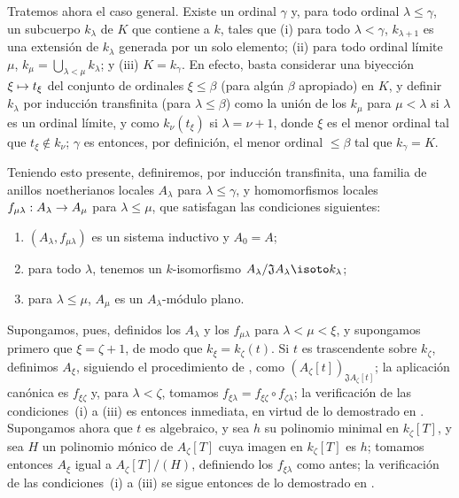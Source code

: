 \documentclass[oneside]{amsart}
\makeatletter
\renewcommand{\leq}{\leqslant}
\newcommand{\ega@arrow}[2]{\mathchoice{#1}{#2}{#2}{#2}}
\let\ega@shortmapsto\mapsto
\renewcommand{\to}{\ega@arrow{\longrightarrow}{\rightarrow}}
\renewcommand{\mapsto}{\ega@arrow{\longmapsto}{\ega@shortmapsto}}
\let\EGAOriginalLabel\label
\renewcommand{\label}[1]{\phantomsection\EGAOriginalLabel{#1}}
\makeatother
\begin{document}
\begin{env}[10.3.1.4]
\label{0.10.3.1.4}
Tratemos ahora el caso general.
Existe un ordinal $\gamma$ y, para todo ordinal $\lambda\leq\gamma$, un subcuerpo $k_\lambda$ de $K$ que contiene a $k$, tales que (i) para todo $\lambda<\gamma$, $k_{\lambda+1}$ es una extensión de $k_\lambda$ generada por un solo elemento; (ii) para todo ordinal límite $\mu$, $k_\mu=\bigcup_{\lambda<\mu}k_\lambda$; y (iii) $K=k_\gamma$.
En efecto, basta considerar una biyección $\xi\mapsto t_\xi$ del conjunto de ordinales $\xi\leq\beta$ (para algún $\beta$ apropiado) en $K$, y definir $k_\lambda$ por inducción transfinita (para $\lambda\leq\beta$) como la unión de los $k_\mu$ para $\mu<\lambda$ si $\lambda$ es un ordinal límite, y como $k_\nu(t_\xi)$ si $\lambda=\nu+1$, donde $\xi$ es el menor ordinal tal que $t_\xi\not\in k_\nu$;
$\gamma$ es entonces, por definición, el menor ordinal $\leq\beta$ tal que $k_\gamma=K$.

Teniendo esto presente, definiremos, por inducción transfinita, una familia de anillos noetherianos locales $A_\lambda$ para $\lambda\leq\gamma$, y homomorfismos locales $f_{\mu\lambda}:A_\lambda\to A_\mu$ para $\lambda\leq\mu$, que satisfagan las condiciones siguientes:
\begin{enumerate}
  \item[(i)] $(A_\lambda,f_{\mu\lambda})$ es un sistema inductivo y $A_0=A$;
  \item[(ii)] para todo $\lambda$, tenemos un $k$-isomorfismo $A_\lambda/\mathfrak{J}A_\lambda\isoto k_\lambda$;
  \item[(iii)] para $\lambda\leq\mu$, $A_\mu$ es un $A_\lambda$-módulo plano.
\end{enumerate}

Supongamos, pues, definidos los $A_\lambda$ y los $f_{\mu\lambda}$ para $\lambda<\mu<\xi$, y supongamos primero que $\xi=\zeta+1$, de modo que $k_\xi=k_\zeta(t)$.
Si $t$ es trascendente sobre $k_\zeta$, definimos $A_\xi$, siguiendo el procedimiento de , como $(A_\zeta[t])_{\mathfrak{J}A_\zeta[t]}$;
la aplicación canónica es $f_{\xi\zeta}$ y, para $\lambda<\zeta$, tomamos $f_{\xi\lambda}=f_{\xi\zeta}\circ f_{\zeta\lambda}$;
la verificación de las condiciones~(i) a (iii) es entonces inmediata, en virtud de lo demostrado en .
Supongamos ahora que $t$ es algebraico, y sea $h$ su polinomio minimal en $k_\zeta[T]$, y sea $H$ un polinomio mónico de $A_\zeta[T]$ cuya imagen en $k_\zeta[T]$ es $h$;
tomamos entonces $A_\xi$ igual a $A_\zeta[T]/(H)$, definiendo los $f_{\xi\lambda}$ como antes;
la verificación de las condiciones~(i) a (iii) se sigue entonces de lo demostrado en .


\end{env}
\end{document}

